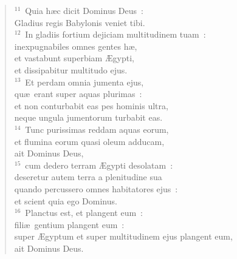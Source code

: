 \begin{flushleft}
\begin{verse}
${}^{11}$~Quia h\ae c dicit Dominus Deus~:\\ Gladius regis Babylonis veniet tibi.\\
${}^{12}$~In gladiis fortium dejiciam multitudinem tuam~:\\ inexpugnabiles omnes gentes h\ae ,\\ et vastabunt superbiam \AE gypti,\\ et dissipabitur multitudo ejus.\\
${}^{13}$~Et perdam omnia jumenta ejus,\\ qu\ae\ erant super aquas plurimas~:\\ et non conturbabit eas pes hominis ultra,\\ neque ungula jumentorum turbabit eas.\\
${}^{14}$~Tunc purissimas reddam aquas eorum,\\ et flumina eorum quasi oleum adducam,\\ ait Dominus Deus,\\
${}^{15}$~cum dedero terram \AE gypti desolatam~:\\ deseretur autem terra a plenitudine sua\\ quando percussero omnes habitatores ejus~:\\ et scient quia ego Dominus.\\
${}^{16}$~Planctus est, et plangent eum~:\\ fili\ae\ gentium plangent eum~:\\ super \AE gyptum et super multitudinem ejus plangent eum,\\ ait Dominus Deus.\end{verse}\end{flushleft}


